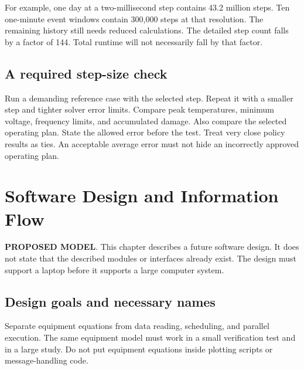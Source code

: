 \documentclass[11pt,a4paper]{report}
\newcommand{\proposed}{\textbf{\textcolor{reportblue}{PROPOSED MODEL}}}
\begin{document}
For example, one day at a two-millisecond step contains 43.2 million steps.
Ten one-minute event windows contain 300,000 steps at that resolution.
The remaining history still needs reduced calculations.
The detailed step count falls by a factor of 144.
Total runtime will not necessarily fall by that factor.

\section{A required step-size check}
Run a demanding reference case with the selected step.
Repeat it with a smaller step and tighter solver error limits.
Compare peak temperatures, minimum voltage, frequency limits, and accumulated damage.
Also compare the selected operating plan.
State the allowed error before the test.
Treat very close policy results as ties.
An acceptable average error must not hide an incorrectly approved operating plan.

\chapter{Software Design and Information Flow}
\label{chap:software}
\proposed. This chapter describes a future software design.
It does not state that the described modules or interfaces already exist.
The design must support a laptop before it supports a large computer system.

\section{Design goals and necessary names}
Separate equipment equations from data reading, scheduling, and parallel execution.
The same equipment model must work in a small verification test and in a large study.
Do not put equipment equations inside plotting scripts or message-handling code.
\end{document}
